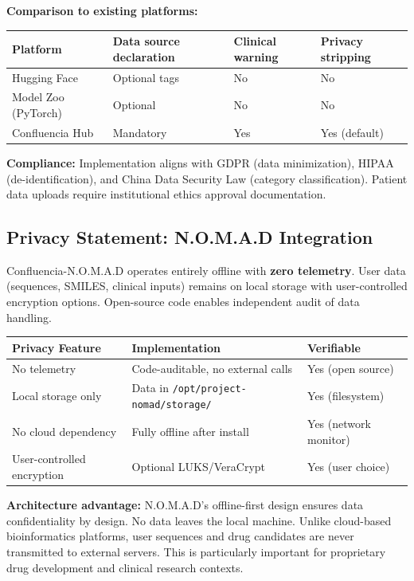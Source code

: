 \textbf{Comparison to existing platforms:}

\begin{tabular}{llll}
\toprule
\textbf{Platform} & \textbf{Data source declaration} & \textbf{Clinical warning} & \textbf{Privacy stripping} \\
\midrule
Hugging Face & Optional tags & No & No \\
Model Zoo (PyTorch) & Optional & No & No \\
Confluencia Hub & Mandatory & Yes & Yes (default) \\
\bottomrule
\end{tabular}

\textbf{Compliance:} Implementation aligns with GDPR (data minimization), HIPAA (de-identification), and China Data Security Law (category classification). Patient data uploads require institutional ethics approval documentation.

\subsection*{Privacy Statement: N.O.M.A.D Integration}

\small Confluencia-N.O.M.A.D operates entirely offline with \textbf{zero telemetry}. User data (sequences, SMILES, clinical inputs) remains on local storage with user-controlled encryption options. Open-source code enables independent audit of data handling.

\begin{tabular}{lll}
\toprule
\textbf{Privacy Feature} & \textbf{Implementation} & \textbf{Verifiable} \\
\midrule
No telemetry & Code-auditable, no external calls & Yes (open source) \\
Local storage only & Data in \texttt{/opt/project-nomad/storage/} & Yes (filesystem) \\
No cloud dependency & Fully offline after install & Yes (network monitor) \\
User-controlled encryption & Optional LUKS/VeraCrypt & Yes (user choice) \\
\bottomrule
\end{tabular}

\textbf{Architecture advantage:} N.O.M.A.D's offline-first design ensures data confidentiality by design. No data leaves the local machine. Unlike cloud-based bioinformatics platforms, user sequences and drug candidates are never transmitted to external servers. This is particularly important for proprietary drug development and clinical research contexts.